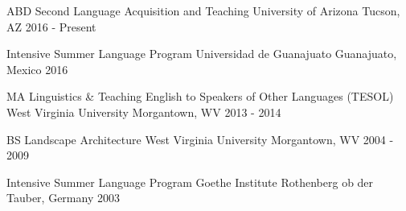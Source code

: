 \begin{cventries}

\cventry
{ABD Second Language Acquisition and Teaching} %
{University of Arizona} %
{Tucson, AZ} %
{2016 - Present} %
{ %
\begin{cvitems}
\end{cvitems}
}
\vspace{-5mm}

\cventry
{Intensive Summer Language Program} %
{Universidad de Guanajuato} %
{Guanajuato, Mexico} %
{2016} %
{ %
\begin{cvitems}
\end{cvitems}
}
\vspace{-5mm}

\cventry
{MA Linguistics \& Teaching English to Speakers of Other Languages (TESOL)} %
{West Virginia University} %
{Morgantown, WV} %
{2013 - 2014} %
{ %
\begin{cvitems}
\end{cvitems}
}
\vspace{-5mm}

\cventry
{BS Landscape Architecture} %
{West Virginia University} %
{Morgantown, WV} %
{2004 - 2009} %
{ %
\begin{cvitems}
\end{cvitems}
}
\vspace{-5mm}

\cventry
{Intensive Summer Language Program} %
{Goethe Institute} %
{Rothenberg ob der Tauber, Germany} %
{2003} %
{ %
\begin{cvitems}
\end{cvitems}
}
\vspace{-10mm}

\end{cventries}